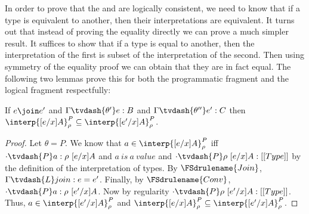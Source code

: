 In order to prove that the  and 
are logically consistent, we need to know that if a type is equivalent
to another, then their interpretations are equivalent.  It turns out
that instead of proving the equality directly we can prove a much
simpler result.  It suffices to show that if a type is equal to
another, then the interpretation of the first is subset of the
interpretation of the second.  Then using symmetry of the equality
proof we can obtain that they are in fact equal.  The following two
lemmas prove this for both the programmatic fragment and the logical
fragment respectfully:

\begin{lemma}
  \label{lemma:pconv_in_interp_are_equiv}
  If $e \join e'$ and $\Gamma \tvdash{\theta'} e:B$ and 
  $\Gamma \tvdash{\theta''} e':C$ then 
  $\interp{[e/x]A}^P_\rho \subseteq \interp{[e'/x]A}^P_\rho$.
\end{lemma}
\begin{proof}
  Let $\theta = P$.  We know that $a \in \interp{[e/x]A}^P_\rho$
  iff $\cdot \tvdash{P} a:\rho\ [e/x]A$ and $a\ is\ a\ value$ and $
  \cdot \tvdash{P} \rho\ [e/x]A:[[Type]]$ 
  by the definition of the interpretation of types.
  By $\FSdrulename{Join}$, $\Gamma \tvdash{L} join:e = e'$. Finally, by 
  $\FSdrulename{Conv}$, 
  $\cdot \tvdash{P} a:\rho\ [e'/x]A$.  Now by regularity $\cdot \tvdash{P} \rho\ [e'/x]A:[[Type]]$.
  Thus, $a \in \interp{[e'/x]A}^P_\rho$ and
  $\interp{[e/x]A}^P_\rho \subseteq \interp{[e'/x]A}^P_\rho$.
\end{proof}

